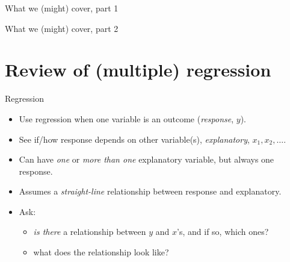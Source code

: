 \documentclass[unknownkeysallowed]{beamer}\usepackage[]{graphicx}\usepackage[]{color}
\begin{document}
\begin{frame}{What we (might) cover, part 1}
  \tableofcontents[sections={1-10}]  %
\end{frame}

\begin{frame}{What we (might) cover, part 2}
  \tableofcontents[sections={11-}]  %
\end{frame}




\section{Review of (multiple) regression}
\frame{\sectionpage}



\begin{frame}{Regression}

  \begin{itemize}
  \item Use regression when one variable is an outcome ({\em response}, $y$).
  \item See if/how response depends on other variable(s), {\em explanatory}, $x_1, x_2,\ldots$.
  \item Can have {\em one} or {\em more than one} explanatory variable, but always one response.
  \item Assumes a {\em straight-line} relationship between response and explanatory.
  \item Ask: 
    \begin{itemize}
    \item {\em is there} a relationship between $y$ and $x$'s, and if so, which ones?
    \item what does the relationship look like?
    \end{itemize}

  \end{itemize}
  
\end{frame}
\end{document}

